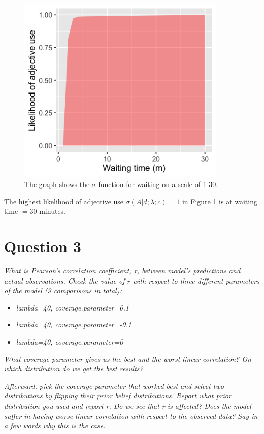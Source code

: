 \documentclass[11pt,a4paper,oneside]{article}
\begin{document}
\begin{figure}[H]
    \centering
    \includegraphics[width=100mm]{figs/Question_2_waiting_time_sigma.png}
    \caption{The graph shows the $\sigma$ function for waiting on a scale of 1-30.}
  \label{fig:q2_waiting_sigma}
\end{figure}
The highest likelihood of adjective use $\sigma(A|d; \lambda; c) = 1$ in Figure \ref{fig:q2_waiting_sigma} is at waiting time $= 30$ minutes.


\section{Question 3}
\label{Question 3}
\textit{What is Pearson’s correlation coefficient, r, between model’s predictions and actual observations. Check the value of $r$ with respect to three different parameters of the model (9 comparisons in total):}

\begin{itemize}
    \item \textit{lambda=40, coverage.parameter=0.1}
    \item \textit{lambda=40, coverage.parameter=-0.1}
    \item \textit{lambda=40, coverage.parameter=0}
\end{itemize}

\textit{What coverage parameter gives us the best and the worst linear correlation? On which distribution do we get the best results?}

\textit{Afterward, pick the coverage parameter that worked best and select two distributions by flipping their prior belief distributions. Report what prior distribution you used and report r. Do we see that r is affected? Does the model suffer in having worse linear correlation with respect to the observed data? Say in a few words why this is the case.}\\
\end{document}
